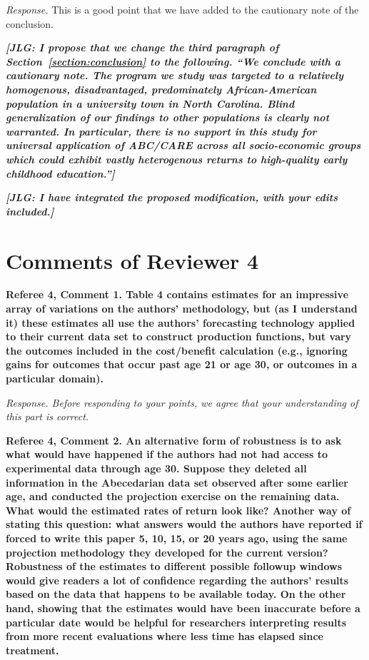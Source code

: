 \noindent \textit{Response.} This is a good point that we have added to the cautionary note of the conclusion.

\textit{\textbf{[JLG: I propose that we change the third paragraph of Section~\ref{section:conclusion} to the following. ``We conclude with a cautionary note. The program we study was targeted to a relatively homogenous, disadvantaged, predominately African-American population in a university town in North Carolina. Blind generalization of our findings to other populations is clearly not warranted. In particular, there is no support in this study for universal application of ABC/CARE across all socio-economic groups which could exhibit vastly heterogenous returns to high-quality early childhood education.'']}}

\textit{\textbf{[JLG: I have integrated the proposed modification, with your edits included.]}}

\section*{Comments of Reviewer 4}

\noindent \textbf{Referee 4, Comment 1. Table 4 contains estimates for an impressive array of variations on the authors' methodology, but (as I understand it) these estimates all use the authors' forecasting technology applied to their current data set to construct production functions, but vary the outcomes included in the cost/benefit calculation (e.g., ignoring gains for outcomes that occur past age 21 or age 30, or outcomes in a particular domain).}

\noindent \textit{Response. Before responding to your points, we agree that your understanding of this part is correct.}
 
\noindent \textbf{Referee 4, Comment 2. An alternative form of robustness is to ask what would have happened if the authors had not had access to experimental data through age 30. Suppose they deleted all information in the Abecedarian data set observed after some earlier age, and conducted the projection exercise on the remaining data. What would the estimated rates of return look like? Another way of stating this question: what answers would the authors have reported if forced to write this paper 5, 10, 15, or 20 years ago, using the same projection methodology they developed for the current version? Robustness of the estimates to different possible followup windows would give readers a lot of confidence regarding the authors' results based on the data that happens to be available today. On the other hand, showing that the estimates would have been inaccurate before a particular date would be helpful for researchers interpreting results from more recent evaluations where less time has elapsed since treatment.}

